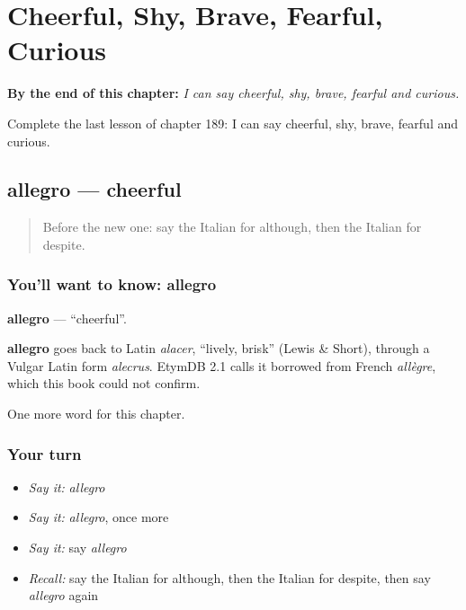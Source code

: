 
\chapter{Cheerful, Shy, Brave, Fearful, Curious}
\label{ch:it-cheerful-shy-brave-fearful-curious}

\begin{chapteropening}
\textbf{By the end of this chapter:} \emph{I can say cheerful, shy, brave, fearful and curious.}

Complete the last lesson of chapter 189: I can say cheerful, shy, brave, fearful and curious.
\end{chapteropening}

\section[allegro]{allegro — cheerful}

\label{lesson:IT-C189-allegro}



\begin{quote}
Before the new one: say the Italian for although, then the Italian for despite.
\end{quote}

\subsection*{You'll want to know: allegro}
\textbf{allegro} — \textquotedblleft{}cheerful\textquotedblright{}.

\begin{cousinweb}
\textbf{allegro} goes back to Latin \emph{alacer}, \textquotedblleft{}lively, brisk\textquotedblright{} (Lewis \& Short), through a Vulgar Latin form \emph{alecrus}. EtymDB 2.1 calls it borrowed from French \emph{allègre}, which this book could not confirm.
\end{cousinweb}

\begin{grammarlens}[title={What you've built}]
One more word for this chapter.
\end{grammarlens}

\subsection*{Your turn}
\begin{itemize}
\raggedright
  \item \emph{Say it:} \emph{allegro}
  \item \emph{Say it:} \emph{allegro}, once more
  \item \emph{Say it:} say \emph{allegro}
  \item \emph{Recall:} say the Italian for although, then the Italian for despite, then say \emph{allegro} again
\end{itemize}

